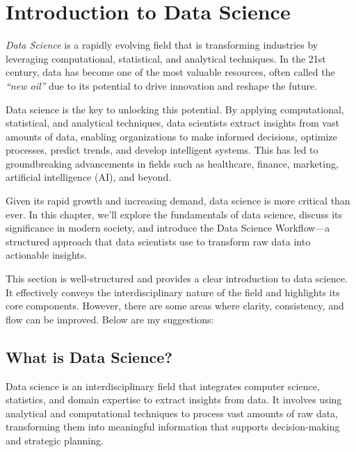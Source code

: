 \documentclass[
]{book}
\theoremstyle{definition}
\theoremstyle{definition}
\theoremstyle{definition}
\theoremstyle{definition}
\theoremstyle{remark}
\begin{document}
\chapter{Introduction to Data Science}\label{chapter-intro-DS}

\emph{Data Science} is a rapidly evolving field that is transforming industries by leveraging computational, statistical, and analytical techniques. In the 21st century, data has become one of the most valuable resources, often called the \emph{``new oil''} due to its potential to drive innovation and reshape the future.

Data science is the key to unlocking this potential. By applying computational, statistical, and analytical techniques, data scientists extract insights from vast amounts of data, enabling organizations to make informed decisions, optimize processes, predict trends, and develop intelligent systems. This has led to groundbreaking advancements in fields such as healthcare, finance, marketing, artificial intelligence (AI), and beyond.

Given its rapid growth and increasing demand, data science is more critical than ever. In this chapter, we'll explore the fundamentals of data science, discuss its significance in modern society, and introduce the Data Science Workflow---a structured approach that data scientists use to transform raw data into actionable insights.

This section is well-structured and provides a clear introduction to data science. It effectively conveys the interdisciplinary nature of the field and highlights its core components. However, there are some areas where clarity, consistency, and flow can be improved. Below are my suggestions:

\section{What is Data Science?}\label{what-is-data-science}

Data science is an interdisciplinary field that integrates computer science, statistics, and domain expertise to extract insights from data. It involves using analytical and computational techniques to process vast amounts of raw data, transforming them into meaningful information that supports decision-making and strategic planning.
\end{document}
